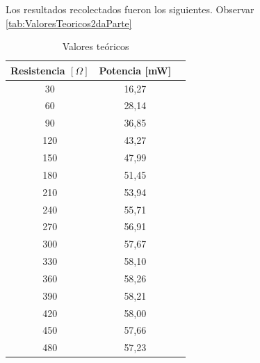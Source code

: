 \documentclass{article}
\begin{document}
            
            \quad Los resultados recolectados fueron los siguientes. Observar \autoref{tab:ValoresTeoricos2daParte}

            \begin{table}[H]
            \centering
                \begin{tabular}{|c|c|c|}
                \hline
                Resistencia  $[\Omega]$     & Potencia [mW]         \\ \hline
                30                          & 16,27                 \\ \hline
                60                          & 28,14                 \\ \hline
                90                          & 36,85                 \\ \hline
                120                         & 43,27                 \\ \hline
                150                         & 47,99                 \\ \hline
                180                         & 51,45                 \\ \hline
                210                         & 53,94                 \\ \hline
                240                         & 55,71                 \\ \hline
                270                         & 56,91                 \\ \hline
                300                         & 57,67                 \\ \hline
                330                         & 58,10                 \\ \hline
                360                         & 58,26                 \\ \hline
                390                         & 58,21                 \\ \hline
                420                         & 58,00                 \\ \hline
                450                         & 57,66                 \\ \hline
                480                         & 57,23                 \\ \hline
                \end{tabular}
            \caption{Valores teóricos}
            \label{tab:ValoresTeoricos2daParte}
            \end{table}
\end{document}
